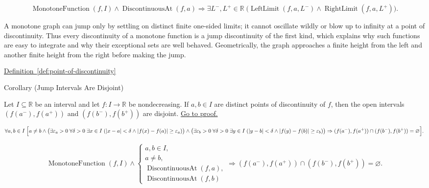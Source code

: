 \begin{remark*}
\[
\operatorname{MonotoneFunction}(f,I) \land \operatorname{DiscontinuousAt}(f,a) \Longrightarrow \exists L^{-},L^{+} \in \mathbb{R} \; \bigl(\operatorname{LeftLimit}(f,a,L^{-}) \land \operatorname{RightLimit}(f,a,L^{+})\bigr).
\]
\end{remark*}

\begin{remark*}[Interpretation]
A monotone graph can jump only by settling on distinct finite one-sided limits; it cannot oscillate wildly or blow up to infinity at a point of discontinuity. Thus every discontinuity of a monotone function is a jump discontinuity of the first kind, which explains why such functions are easy to integrate and why their exceptional sets are well behaved. Geometrically, the graph approaches a finite height from the left and another finite height from the right before making the jump.
\end{remark*}

\begin{remark*}[Dependencies]
\hyperref[def:point-of-discontinuity]{Definition~\ref{def:point-of-discontinuity}}
\end{remark*}

\begin{corollarybox}{Corollary (Jump Intervals Are Disjoint)}
\begin{corollary}
\label{cor:jump-intervals-for-monotone-discontinuities}
Let $I \subseteq \mathbb{R}$ be an interval and let $f:I \to \mathbb{R}$ be nondecreasing. If $a,b \in I$ are distinct points of discontinuity of $f$, then the open intervals $(f(a^-),f(a^+))$ and $(f(b^-),f(b^+))$ are disjoint.%
\hyperref[prf:jump-intervals-for-monotone-discontinuities]{Go to proof.}
\end{corollary}
\end{corollarybox}

\begin{remark*}
\[
\forall a,b\in I\;
\Bigl[
a\ne b\land
\bigl(\exists \varepsilon_a>0\;\forall \delta>0\;\exists x\in I\;
(|x-a|<\delta\land |f(x)-f(a)|\ge\varepsilon_a)\bigr)\land
\bigl(\exists \varepsilon_b>0\;\forall \delta>0\;\exists y\in I\;
(|y-b|<\delta\land |f(y)-f(b)|\ge\varepsilon_b)\bigr)
\Rightarrow
(f(a^-),f(a^+))\cap(f(b^-),f(b^+))=\varnothing
\Bigr].
\]
\end{remark*}

\begin{remark*}
\[
\operatorname{MonotoneFunction}(f,I)\land
\begin{cases}
a,b\in I,\\
a\neq b,\\
\operatorname{DiscontinuousAt}(f,a),\\
\operatorname{DiscontinuousAt}(f,b)
\end{cases}
\Longrightarrow
(f(a^-),f(a^+))\cap(f(b^-),f(b^+))=\varnothing.
\]
\end{remark*}

